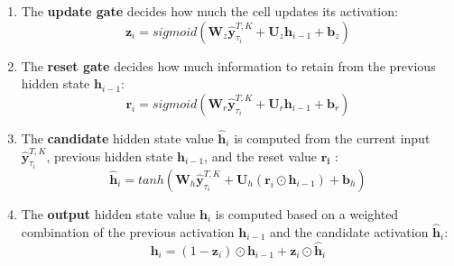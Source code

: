 \documentclass[letterpaper,12pt,titlepage,oneside,final]{book}
\numberwithin{equation}{section}
\theoremstyle{definition}
\newcommand{\vb}{\mathbf{b}}
\newcommand{\vy}{\mathbf{y}}
\newcommand{\vh}{\mathbf{h}}
\newcommand{\vW}{\pmb{W}}
\newcommand{\vU}{\pmb{U}}
\begin{document}
\begin{enumerate}
	\item The \textbf{update gate} decides how much the cell updates its activation:
	\[\mathbf{z}_i= sigmoid ( \vW_z \widehat{\vy}^{T,K}_{\tau_{i}} + \vU_z \vh_{i-1} +\vb_z)\]
	\item The \textbf{reset gate} decides how much  information to retain from the  previous hidden state $\vh_{i-1}$:
	\[\mathbf{r}_i= sigmoid ( \vW_r \widehat{\vy}^{T,K}_{\tau_{i}} + \vU_r \vh_{i-1} +\vb_r)\]
	\item The \textbf{candidate} hidden state value $\widehat{\vh}_i$ is computed from the current input $\widehat{\vy}^{T,K}_{\tau_{i}}$,  previous hidden state $\vh_{i-1}$, and the reset value $\mathbf{r_i}$ :
	\[
	\widehat{\vh}_i=tanh( \vW_h \widehat{\vy}^{T,K}_{\tau_{i}}  + \vU_h (\mathbf{r}_i \odot \vh_{i-1}) +\vb_h)
	\]
	\item  The \textbf{output} hidden state value $\vh_{i}$ is  computed based on a weighted combination of the previous activation $\vh_{i-1}$ and the candidate activation $\widehat{\vh}_i$:
	\[
	\vh_i=(1-\mathbf{z}_i) \odot \vh_{i-1} + \mathbf{z}_i \odot \widehat{\vh}_i
	\]
\end{enumerate}
\end{document}
